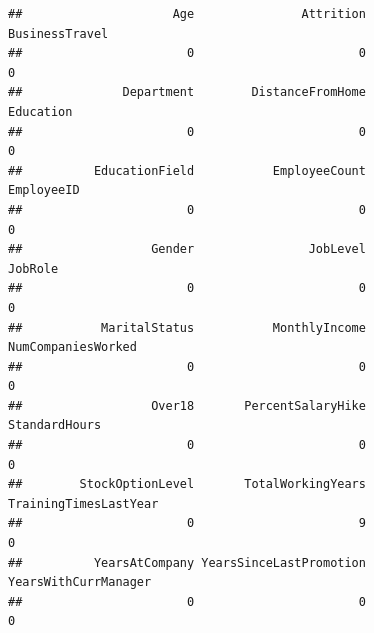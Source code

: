 \documentclass[
]{article}
\newenvironment{Shaded}{\begin{snugshade}}{\end{snugshade}}
\newcommand{\AttributeTok}[1]{\textcolor[rgb]{0.77,0.63,0.00}{#1}}
\newcommand{\CommentTok}[1]{\textcolor[rgb]{0.56,0.35,0.01}{\textit{#1}}}
\newcommand{\ConstantTok}[1]{\textcolor[rgb]{0.00,0.00,0.00}{#1}}
\newcommand{\FunctionTok}[1]{\textcolor[rgb]{0.00,0.00,0.00}{#1}}
\newcommand{\NormalTok}[1]{#1}
\newcommand{\OtherTok}[1]{\textcolor[rgb]{0.56,0.35,0.01}{#1}}
\newcommand{\SpecialCharTok}[1]{\textcolor[rgb]{0.00,0.00,0.00}{#1}}
\begin{document}
\begin{verbatim}
##                     Age               Attrition          BusinessTravel 
##                       0                       0                       0 
##              Department        DistanceFromHome               Education 
##                       0                       0                       0 
##          EducationField           EmployeeCount              EmployeeID 
##                       0                       0                       0 
##                  Gender                JobLevel                 JobRole 
##                       0                       0                       0 
##           MaritalStatus           MonthlyIncome      NumCompaniesWorked 
##                       0                       0                       0 
##                  Over18       PercentSalaryHike           StandardHours 
##                       0                       0                       0 
##        StockOptionLevel       TotalWorkingYears   TrainingTimesLastYear 
##                       0                       9                       0 
##          YearsAtCompany YearsSinceLastPromotion    YearsWithCurrManager 
##                       0                       0                       0
\end{verbatim}

\begin{Shaded}
\end{Shaded}
\end{document}
